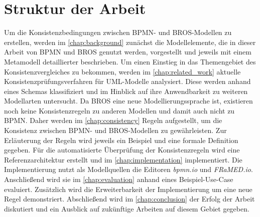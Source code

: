 \section{Struktur der Arbeit}

Um die Konsistenzbedingungen zwischen BPMN- und BROS-Modellen zu erstellen, werden im \cref{chap:background} zunächst die Modellelemente, die in dieser Arbeit von BPMN und BROS genutzt werden, vorgestellt und jeweils mit einem Metamodell detaillierter beschrieben.
Um einen Einstieg in das Themengebiet des Konsistenzvergleiches zu bekommen, werden im \cref{chap:related_work} aktuelle Konsistenzprüfungsverfahren für UML-Modelle analysiert.
Diese werden anhand eines Schemas klassifiziert und im Hinblick auf ihre Anwendbarkeit zu weiteren Modellarten untersucht.
Da BROS eine neue Modellierungssprache ist, existieren noch keine Konsistenzregeln zu anderen Modellen und damit auch nicht zu BPMN.
Daher werden im \cref{chap:consistency} Regeln aufgestellt, um die Konsistenz zwischen BPMN- und BROS-Modellen zu gewährleisten.
Zur Erläuterung der Regeln wird jeweils ein Beispiel und eine formale Definition gegeben.
Für die automatisierte Überprüfung der Konsistenzregeln wird eine Referenzarchitektur erstellt und im \cref{chap:implementation} implementiert.
Die Implementierung nutzt als Modellquellen die Editoren \emph{bpmn.io} und \emph{FRaMED.io}.
Anschließend wird sie im \cref{chap:evaluation} anhand eines Beispiel-Use-Case evaluiert.
Zusätzlich wird die Erweiterbarkeit der Implementierung um eine neue Regel demonstriert.
Abschließend wird im \cref{chap:conclusion} der Erfolg der Arbeit diskutiert und ein Ausblick auf zukünftige Arbeiten auf diesem Gebiet gegeben.
